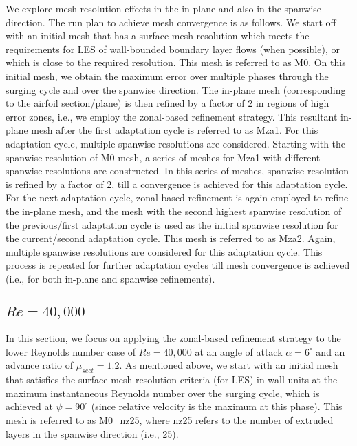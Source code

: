 We explore mesh resolution effects in the in-plane and also in the spanwise direction. 
The run plan to achieve mesh convergence is as follows. 
We start off with an initial mesh that has a surface mesh resolution which meets the requirements for LES of wall-bounded boundary layer flows (when possible), or which is close to the required resolution. This mesh is referred to as M0.
On this initial mesh, we obtain the maximum error over multiple phases through the surging cycle and over the spanwise direction.
The in-plane mesh (corresponding to the airfoil section/plane) is then refined by a factor of 2 in regions of high error zones, i.e., we employ the zonal-based refinement strategy.
This resultant in-plane mesh after the first adaptation cycle is referred to as Mza1.
For this adaptation cycle, multiple spanwise resolutions are considered. Starting with the spanwise resolution of M0 mesh, a series of meshes for Mza1 with different spanwise resolutions are constructed.
In this series of meshes, spanwise resolution is refined by a factor of 2, till a convergence is achieved for this adaptation cycle. 
For the next adaptation cycle, zonal-based refinement is again employed to refine the in-plane mesh, and the mesh with the second highest spanwise resolution of the previous/first adaptation cycle is used as the initial spanwise resolution for the current/second adaptation cycle.
This mesh is referred to as Mza2.
Again, multiple spanwise resolutions are considered for this adaptation cycle.
This process is repeated for further adaptation cycles till mesh convergence is achieved (i.e., for both in-plane and spanwise refinements).

\subsection{ $Re=40,000$}


In this section, we focus on applying the zonal-based refinement strategy to the lower Reynolds number case of $Re=40,000$ at an angle of attack $\alpha=6^\circ$ and an advance ratio of $\mu_{sect}=1.2$.
As mentioned above, we start with an initial mesh that satisfies the surface mesh resolution criteria (for LES) in wall units at the maximum instantaneous Reynolds number over the surging cycle, which is achieved at $\psi=90^\circ$ (since relative velocity is the maximum at this phase). 
This mesh is referred to as M0\_nz25, where nz25 refers to the number of extruded layers in the spanwise direction (i.e., 25).

